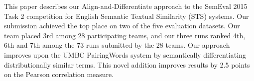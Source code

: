 This paper describes our Align-and-Differentiate approach to the SemEval 2015 Task 2 competition for English Semantic Textual Similarity (STS) systems. Our submission achieved the top place on two of the five evaluation datasets. Our team placed 3rd among 28 participating teams, and our three runs ranked 4th, 6th and 7th among the 73 runs submitted by the 28 teams. Our approach improves upon the UMBC PairingWords system by semantically differentiating distributionally similar terms. This novel addition improves results by 2.5 points on the Pearson correlation measure.
